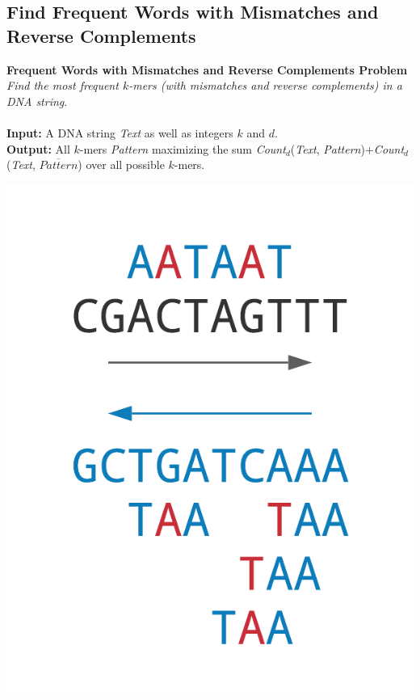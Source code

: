 \documentclass{article}
\begin{document}
\subsection{Find Frequent Words with Mismatches and Reverse Complements}
\hline\vspace{5}
\noindent \textbf{Frequent Words with Mismatches and Reverse Complements Problem}\\
\emph{Find the most frequent $k$-mers (with mismatches and reverse complements) in a DNA string}.\\ \\
\textbf{Input:} A DNA string \emph{Text} as well as integers $k$ and $d$.\\
\textbf{Output:} All $k$-mers \emph{Pattern} maximizing the sum \emph{Count}$_d$(\emph{Text}, \emph{Pattern})$+$\emph{Count}$_d$(\emph{Text}, $\overline{Pattern}$) over all possible $k$-mers.
\begin{center}
    \includegraphics[scale=0.2]{c1/logos/1J.png} 
\end{center}
\hline\vspace{5}
\end{document}
